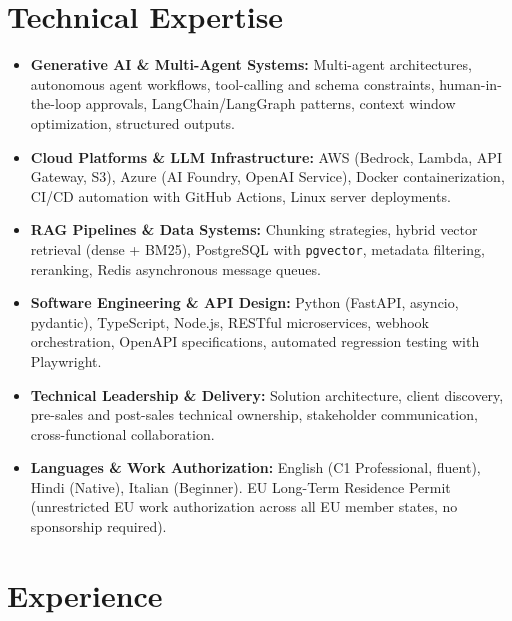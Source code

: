 \documentclass[10pt,a4paper]{article}
\begin{document}
\section{Technical Expertise}
\begin{itemize}
  \item \textbf{Generative AI \& Multi-Agent Systems:} Multi-agent architectures, autonomous agent workflows, tool-calling and schema constraints, human-in-the-loop approvals, LangChain/LangGraph patterns, context window optimization, structured outputs.
  \item \textbf{Cloud Platforms \& LLM Infrastructure:} AWS (Bedrock, Lambda, API Gateway, S3), Azure (AI Foundry, OpenAI Service), Docker containerization, CI/CD automation with GitHub Actions, Linux server deployments.
  \item \textbf{RAG Pipelines \& Data Systems:} Chunking strategies, hybrid vector retrieval (dense + BM25), PostgreSQL with \texttt{pgvector}, metadata filtering, reranking, Redis asynchronous message queues.
  \item \textbf{Software Engineering \& API Design:} Python (FastAPI, asyncio, pydantic), TypeScript, Node.js, RESTful microservices, webhook orchestration, OpenAPI specifications, automated regression testing with Playwright.
  \item \textbf{Technical Leadership \& Delivery:} Solution architecture, client discovery, pre-sales and post-sales technical ownership, stakeholder communication, cross-functional collaboration.
  \item \textbf{Languages \& Work Authorization:} English (C1 Professional, fluent), Hindi (Native), Italian (Beginner). EU Long-Term Residence Permit (unrestricted EU work authorization across all EU member states, no sponsorship required).
\end{itemize}

\section{Experience}
\end{document}
